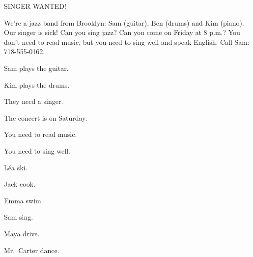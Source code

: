 \begin{anglais}
\begin{tcolorbox}[otBase,colback=white,colframe=otRule,boxrule=0.5pt,fontupper=\fontsize{10.8}{14.4}\selectfont]
{\otSemi\fontsize{11}{13}\selectfont SINGER WANTED!}\par\vspace{1.4mm}
We're a jazz band from Brooklyn: Sam (guitar), Ben (drums) and Kim (piano). Our singer is sick!
Can you sing jazz? Can you come on Friday at 8 p.m.? You don't need to read music, but you need to
sing well and speak English. Call Sam: 718-555-0162.
\par{}
\end{tcolorbox}
\begin{questions}[2]
\item Sam plays the guitar. \hfill{}
\item Kim plays the drums. \hfill{}
\item They need a singer. \hfill{}
\item The concert is on Saturday. \hfill{}
\item You need to read music. \hfill{}
\item You need to sing well. \hfill{}
\end{questions}
\end{anglais}

\begin{questions}[2]
\item Léa \hfill {}\quad{}\quad ski.
\item Jack \hfill {}\quad{}\quad cook.
\item Emma \hfill {}\quad{}\quad swim.
\item Sam \hfill {}\quad{}\quad sing.
\item Maya \hfill {}\quad{}\quad drive.
\item Mr.\ Carter \hfill {}\quad{}\quad dance.
\end{questions}

